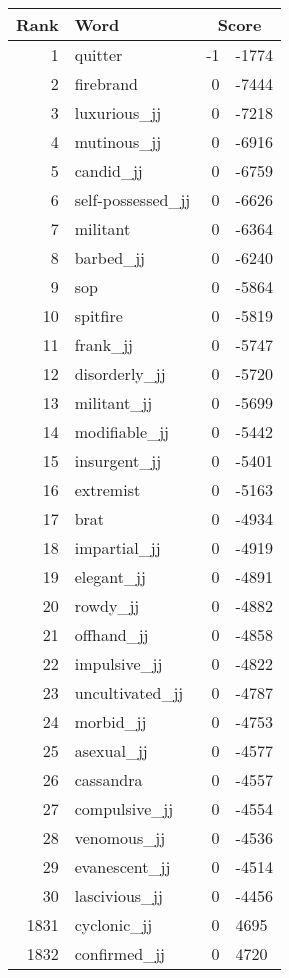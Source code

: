 \begin{longtable}[!htbp]{| rlr@{.}l |}
    \hline
    \textbf{Rank} & \textbf{Word} & \multicolumn{2}{c|}{\textbf{Score}} \\
    \hline
    \endhead
    1 & quitter & -1 & -1774 \\
    2 & firebrand & 0 & -7444 \\
    3 & luxurious\_jj & 0 & -7218 \\
    4 & mutinous\_jj & 0 & -6916 \\
    5 & candid\_jj & 0 & -6759 \\
    6 & self-possessed\_jj & 0 & -6626 \\
    7 & militant & 0 & -6364 \\
    8 & barbed\_jj & 0 & -6240 \\
    9 & sop & 0 & -5864 \\
    10 & spitfire & 0 & -5819 \\
    11 & frank\_jj & 0 & -5747 \\
    12 & disorderly\_jj & 0 & -5720 \\
    13 & militant\_jj & 0 & -5699 \\
    14 & modifiable\_jj & 0 & -5442 \\
    15 & insurgent\_jj & 0 & -5401 \\
    16 & extremist & 0 & -5163 \\
    17 & brat & 0 & -4934 \\
    18 & impartial\_jj & 0 & -4919 \\
    19 & elegant\_jj & 0 & -4891 \\
    20 & rowdy\_jj & 0 & -4882 \\
    21 & offhand\_jj & 0 & -4858 \\
    22 & impulsive\_jj & 0 & -4822 \\
    23 & uncultivated\_jj & 0 & -4787 \\
    24 & morbid\_jj & 0 & -4753 \\
    25 & asexual\_jj & 0 & -4577 \\
    26 & cassandra & 0 & -4557 \\
    27 & compulsive\_jj & 0 & -4554 \\
    28 & venomous\_jj & 0 & -4536 \\
    29 & evanescent\_jj & 0 & -4514 \\
    30 & lascivious\_jj & 0 & -4456 \\
    1831 & cyclonic\_jj & 0 & 4695 \\
    1832 & confirmed\_jj & 0 & 4720 \\

\end{longtable}
